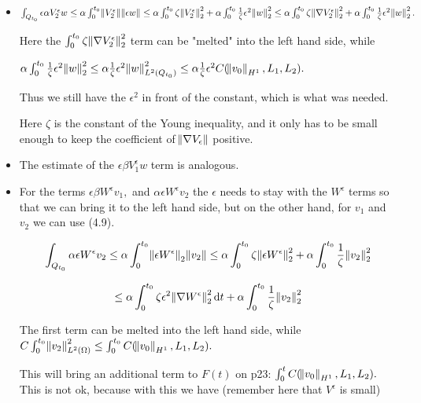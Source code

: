 \documentclass[11pt]{article}
\newcommand*\diff{\mathop{}\!\mathrm{d}}
\begin{document}
\begin{enumerate}
    \begin{itemize}
    
      \item $ \int_{Q_{t_0}} \epsilon \alpha V^\epsilon_2 w \leq \alpha \int_0^{t_0} \norm{V^\epsilon_2} \norm{\epsilon w}  \leq \alpha \int_0^{t_0} \zeta \norm{V^\epsilon_2}^2_2 + \alpha \int_0^{t_0} \frac{1}{\zeta} \epsilon^2 \norm{ w}^2_2 \leq \alpha \int_0^{t_0} \zeta \norm{\nabla V^\epsilon_2}^2_2 + \alpha \int_0^{t_0} \frac{1}{\zeta} \epsilon^2 \norm{ w}^2_2.$
      
      Here the $\int_0^{t_0} \zeta \norm{\nabla V^\epsilon_2}^2_2$  term can be "melted" into the left hand side, while
      
      $\alpha \int_0^{t_0} \frac{1}{\zeta} \epsilon^2 \norm{w}^2_2 \leq \alpha \frac{1}{\zeta} \epsilon^2 \norm{w}^2_{L^2(Q_{t_0})} \leq \alpha \frac{1}{\zeta} \epsilon^2 C(\norm{v_0}_{H^1}, L_1, L_2).$
      
      Thus we still have the $\epsilon^2$ in front of the constant, which is what was needed.
      
      Here $\zeta$ is the constant of the Young inequality, and it only has to be small enough to keep the coefficient of $\norm{\nabla V_\epsilon}$ positive.
      
      \item The estimate of the $\epsilon \beta V^\epsilon_1 w$ term is analogous.
      
      \item For the terms $\epsilon \beta W^\epsilon v_1,$ and $\alpha \epsilon W^\epsilon v_2$ the $\epsilon$ needs to stay with the $W^\epsilon$ terms so that we can bring it to the left hand side, but on the other hand, for $v_1$ and $v_2$ we can use (4.9).
      
      $$ \int_{Q_{t_0}} \alpha \epsilon W^\epsilon v_2 \leq \alpha \int_0^{t_0} \norm{\epsilon W^\epsilon}_2 \norm{v_2} \leq \alpha \int_0^{t_0} \zeta \norm{\epsilon W^\epsilon}_2^2 + \alpha \int_0^{t_0} \frac{1}{\zeta} \norm{v_2}_2^2 $$
      
      $$ \leq \alpha \int_0^{t_0} \zeta \epsilon^2 \norm{\nabla W^\epsilon}_2^2 \diff t + \alpha \int_0^{t_0} \frac{1}{\zeta} \norm{v_2}_2^2 $$
      
      The first term can be melted into the left hand side, while $C \int_0^{t_0} \norm{v_2}_{L^2(\Omega)}^2 \leq  \int_0^{t_0} C(\norm{v_0}_{H^1}, L_1, L_2).$
      
      This will bring an additional term to $F(t)$ on p23: $ \int_0^t C(\norm{v_0}_{H^1}, L_1, L_2).$ This is not ok, because with this we have (remember here that $V^\epsilon$ is small)
      

\end{itemize}
\end{enumerate}
\end{document}
